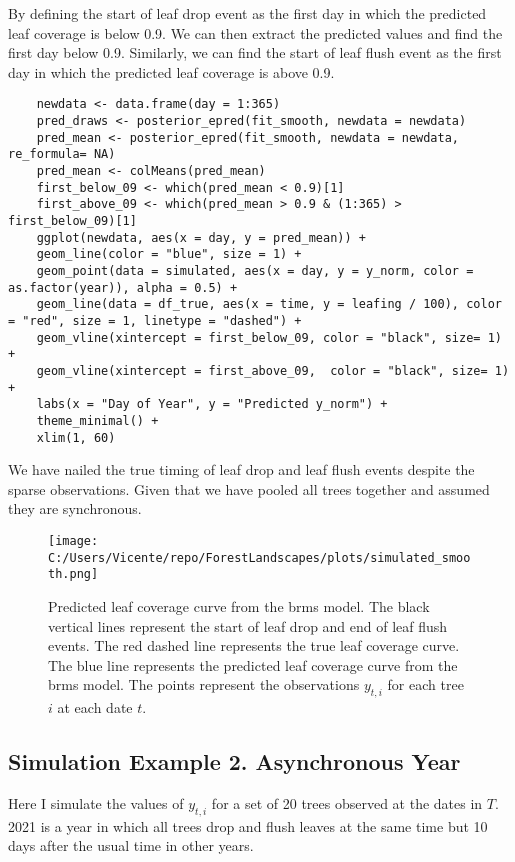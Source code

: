 \documentclass{article}
\begin{document}
By defining the start of leaf drop event as the first day in which the predicted leaf coverage is below 0.9.
We can then extract the predicted values and find the first day below 0.9.
Similarly, we can find the start of leaf flush event as the first day in which the predicted leaf coverage is above 0.9.

\begin{verbatim}
    newdata <- data.frame(day = 1:365)
    pred_draws <- posterior_epred(fit_smooth, newdata = newdata)
    pred_mean <- posterior_epred(fit_smooth, newdata = newdata, re_formula= NA)
    pred_mean <- colMeans(pred_mean)
    first_below_09 <- which(pred_mean < 0.9)[1]
    first_above_09 <- which(pred_mean > 0.9 & (1:365) > first_below_09)[1]
    ggplot(newdata, aes(x = day, y = pred_mean)) +
    geom_line(color = "blue", size = 1) +
    geom_point(data = simulated, aes(x = day, y = y_norm, color = as.factor(year)), alpha = 0.5) +
    geom_line(data = df_true, aes(x = time, y = leafing / 100), color = "red", size = 1, linetype = "dashed") +
    geom_vline(xintercept = first_below_09, color = "black", size= 1) +
    geom_vline(xintercept = first_above_09,  color = "black", size= 1) +
    labs(x = "Day of Year", y = "Predicted y_norm") +
    theme_minimal() +
    xlim(1, 60)
\end{verbatim}
We have nailed the true timing of leaf drop and leaf flush events despite the sparse observations.
Given that we have pooled all trees together and assumed they are synchronous.
\begin{figure}
    \centering
    \texttt{[image: C:/Users/Vicente/repo/ForestLandscapes/plots/simulated\_smooth.png]}
    \caption{Predicted leaf coverage curve from the brms model. The black vertical lines represent the start of leaf drop and end of leaf flush events. The red dashed line represents the true leaf coverage curve. The blue line represents the predicted leaf coverage curve from the brms model. The points represent the observations $y_{t, i}$ for each tree $i$ at each date $t$.}
    \label{fig:interpolation_problem_fit}
\end{figure}

\subsection{Simulation Example 2. Asynchronous Year}
Here I simulate the values of $y_{t, i}$ for a set of 20 trees observed at the dates in $T$.
2021 is a year in which all trees drop and flush leaves at the same time but 10 days after the usual time in other years.
\end{document}
